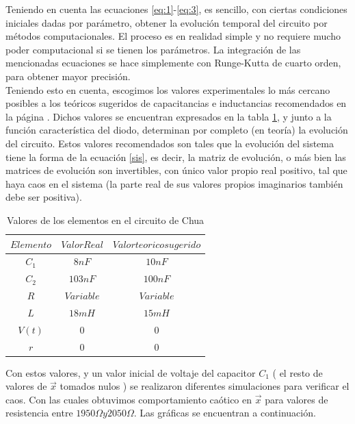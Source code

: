 \documentclass[%
 reprint,
 amsmath,amssymb,
 aps,
]{revtex4-1}
\begin{document}
Teniendo en cuenta las ecuaciones \ref{eq:1}-\ref{eq:3}, es sencillo, con ciertas condiciones iniciales dadas por parámetro, obtener la evolución temporal del circuito por métodos computacionales. El proceso es en realidad simple y no requiere mucho poder computacional si se tienen los parámetros. La integración de las mencionadas ecuaciones se hace simplemente con Runge-Kutta de cuarto orden, para obtener mayor precisión.\\

Teniendo esto en cuenta, escogimos los valores experimentales lo más cercano posibles a los teóricos sugeridos de capacitancias e inductancias recomendados en la página \cite{sitio}. Dichos valores se encuentran expresados en la tabla \ref{table:valorescircuito}, y junto a la función característica del diodo, determinan por completo (en teoría) la evolución del circuito. Estos valores recomendados son tales que la evolución del sistema tiene la forma de la ecuación \ref{sis}, es decir, la matriz de evolución, o más bien las matrices de evolución son invertibles, con único valor propio real positivo, tal que haya caos en el sistema (la parte real de sus valores propios imaginarios también debe ser positiva).\\

\begin{table}[h!]
\centering
\begin{tabular}{|c|c|c|}
	\hline $ Elemento $ & $Valor Real$ & $Valor teorico sugerido$ \\ 
	\hline\hline
	$C_1$ & $8nF$ & $10nF$ \\
	$C_2$ & $103nF$& $100nF$ \\
	$R$ & $Variable$& $Variable$ \\
	$L$ & $18mH$ & $15mH$ \\
	$V(t)$ & $0$ & $0$ \\
	$r$ & $ 0 $& $0$ \\
		[1ex] 
 \hline
 \end{tabular} 
  \caption{Valores de los elementos en el circuito de Chua}
\label{table:valorescircuito} 
\end{table}

Con estos valores, y un valor inicial de voltaje del capacitor $C_1$ ( el resto de valores de $\vec{x}$ tomados nulos ) se realizaron diferentes simulaciones para verificar el caos. Con las cuales obtuvimos comportamiento caótico en $\vec{x}$ para valores de resistencia entre $1950\Omega y 2050\Omega$. Las gráficas se encuentran a continuación.\\
\end{document}
